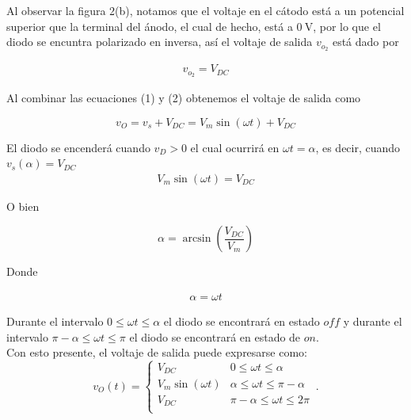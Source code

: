 \documentclass{article}
\begin{document}
\noindent Al observar la figura 2(b), notamos que el voltaje en el cátodo está a un potencial superior que la terminal del ánodo, el cual de hecho, está a $\qty{0}{\volt}$, por lo que el diodo se encuntra polarizado en inversa, así el voltaje de salida $v_{o_2}$ está dado por

\begin{align}
	v_{o_2} = V_{DC}
\end{align}

\noindent Al combinar las ecuaciones (1) y (2) obtenemos el voltaje de salida como

\begin{tcolorbox}[colback=red!5!white,colframe=red!75!black,arc=0mm,boxrule=0mm,width=(\linewidth+0.5cm)]
	\begin{equation}
		v_O = v_s + V_{DC} = V_m \sin (\omega t) + V_{DC}
	\end{equation}
\end{tcolorbox}

\noindent El diodo se encenderá cuando $v_D > 0$ el cual ocurrirá en $\omega t = \alpha$, es decir, cuando $v_s(\alpha) = V_{DC}$
\begin{align}
	V_m \sin (\omega t) = V_{DC} \nonumber
\end{align}

\noindent O bien

\begin{tcolorbox}[colback=red!5!white,colframe=red!75!black,arc=0mm,boxrule=0mm,width=(\linewidth+0.5cm)]
	\begin{equation}
		\alpha = \arcsin \left( \frac{V_{DC}}{V_m} \right)
	\end{equation}
\end{tcolorbox}

\noindent Donde

\begin{align}
	\alpha = \omega t
\end{align}

\noindent Durante el intervalo $0 \leq \omega t \leq \alpha$ el diodo se encontrará en estado $off$ y durante el intervalo $\pi - \alpha \leq \omega t \leq \pi$ el diodo se encontrará en estado de $on$. \\

\noindent Con esto presente, el voltaje de salida puede expresarse como:
\begin{equation}
	v_O(t) =  
	\begin{cases}
		V_{DC} \quad & 0 \leq \omega t \leq \alpha\\
		V_m \sin (\omega t) & \alpha \leq \omega t \leq \pi - \alpha \\
		V_{DC} \quad & \pi - \alpha \leq \omega t \leq 2 \pi\\
	\end{cases}\,.
\end{equation}
\end{document}

